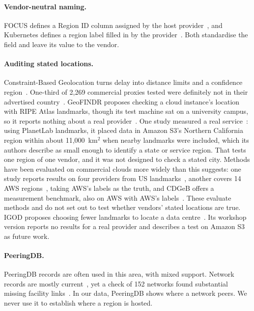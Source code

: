 \documentclass[10pt,twocolumn]{article}
\begin{document}
\paragraph{Vendor-neutral naming.} FOCUS defines a Region ID column assigned by the host provider~\citep{focus_region_id}, and Kubernetes defines a region label filled in by the provider~\citep{kubernetes_labels}. Both standardise the field and leave its value to the vendor.

\paragraph{Auditing stated locations.} Constraint-Based Geolocation turns delay into distance limits and a confidence region~\citep{gueye2006constraint}. One-third of 2{,}269 commercial proxies tested were definitely not in their advertised country~\citep{weinberg2018how}. GeoFINDR proposes checking a cloud instance's location with RIPE Atlas landmarks, though its test machine sat on a university campus, so it reports nothing about a real provider~\citep{ider2025geofindr}. One study measured a real service~\citep{gondree2013geolocation}: using PlanetLab landmarks, it placed data in Amazon S3's Northern California region within about 11{,}000~km$^2$ when nearby landmarks were included, which its authors describe as small enough to identify a state or service region. That tests one region of one vendor, and it was not designed to check a stated city. Methods have been evaluated on commercial clouds more widely than this suggests: one study reports results on four providers from US landmarks~\citep{biswal2015enhanced}, another covers 14 AWS regions~\citep{stephanow2017continuous}, taking AWS's labels as the truth, and CDGeB offers a measurement benchmark, also on AWS with AWS's labels~\citep{offer2023cdgeb}. These evaluate methods and do not set out to test whether vendors' stated locations are true. IGOD proposes choosing fewer landmarks to locate a data centre~\citep{jaiswal2015igod,jaiswal2016igod}. Its workshop version reports no results for a real provider and describes a test on Amazon S3 as future work.

\paragraph{PeeringDB.} PeeringDB records are often used in this area, with mixed support. Network records are mostly current~\citep{lodhi2014using}, yet a check of 152 networks found substantial missing facility links~\citep{giotsas2015mapping}. In our data, PeeringDB shows where a network peers. We never use it to establish where a region is hosted.
\end{document}
